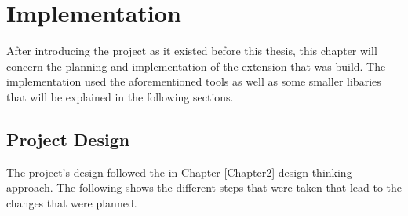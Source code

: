 
\chapter{Implementation} %
\label{Chapter4} %

After introducing the project as it existed before this thesis,
this chapter will concern the planning and implementation of the extension that was build.
The implementation used the aforementioned tools as well as some smaller libaries that will be explained in the following sections.

\section{Project Design}
The project's design followed the in Chapter \ref{Chapter2} design thinking approach.
The following shows the different steps that were taken that lead to the changes that were planned.

